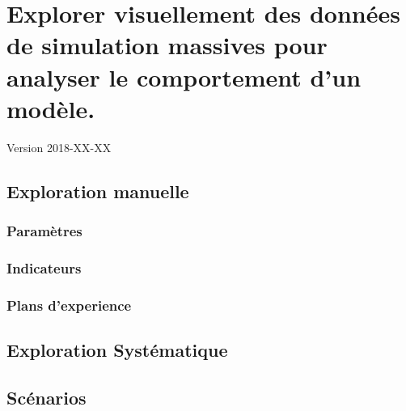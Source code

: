 \documentclass[12pt, a4paper, oneside]{book}
\begin{document}
	\setcounter{part}{1}
	\setcounter{chapter}{4}
	\setcounter{secnumdepth}{4}
	 
	\chapter{Explorer visuellement des données de simulation massives pour analyser le comportement d'un modèle.} 
	\begin{center}
		{\large Version 2018-XX-XX}
	\end{center}
 
 
\section{Exploration manuelle} 
 
\subsection{Paramètres} 
 
\subsection{Indicateurs} 
 
\subsection{Plans d'experience} 
 
\section{Exploration Systématique} 
 
\section{Scénarios} 
 
\end{document}
